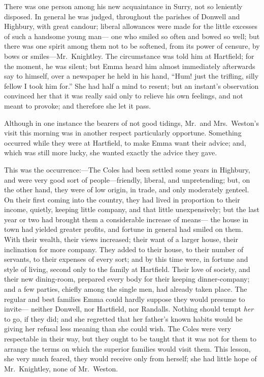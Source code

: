 There was one person among his new acquaintance in Surry, not so
leniently disposed.  In general he was judged, throughout the parishes
of Donwell and Highbury, with great candour; liberal allowances
were made for the little excesses of such a handsome young man---%
one who smiled so often and bowed so well; but there was one spirit
among them not to be softened, from its power of censure, by bows
or smiles---Mr.\ Knightley.  The circumstance was told him at Hartfield;
for the moment, he was silent; but Emma heard him almost immediately
afterwards say to himself, over a newspaper he held in his hand,
``Hum! just the trifling, silly fellow I took him for.''  She had
half a mind to resent; but an instant's observation convinced
her that it was really said only to relieve his own feelings,
and not meant to provoke; and therefore she let it pass.

Although in one instance the bearers of not good tidings,
Mr.\ and Mrs.\ Weston's visit this morning was in another respect
particularly opportune.  Something occurred while they were
at Hartfield, to make Emma want their advice; and, which was
still more lucky, she wanted exactly the advice they gave.

This was the occurrence:---The Coles had been settled some years
in Highbury, and were very good sort of people---friendly, liberal,
and unpretending; but, on the other hand, they were of low origin,
in trade, and only moderately genteel.  On their first coming into
the country, they had lived in proportion to their income, quietly,
keeping little company, and that little unexpensively; but the last
year or two had brought them a considerable increase of means---%
the house in town had yielded greater profits, and fortune in general
had smiled on them.  With their wealth, their views increased;
their want of a larger house, their inclination for more company.
They added to their house, to their number of servants,
to their expenses of every sort; and by this time were, in fortune
and style of living, second only to the family at Hartfield.
Their love of society, and their new dining-room, prepared every body
for their keeping dinner-company; and a few parties, chiefly among
the single men, had already taken place.  The regular and best
families Emma could hardly suppose they would presume to invite---%
neither Donwell, nor Hartfield, nor Randalls.  Nothing should
tempt \emph{her} to go, if they did; and she regretted that her father's
known habits would be giving her refusal less meaning than she
could wish.  The Coles were very respectable in their way, but they
ought to be taught that it was not for them to arrange the terms
on which the superior families would visit them.  This lesson,
she very much feared, they would receive only from herself;
she had little hope of Mr.\ Knightley, none of Mr.\ Weston.

